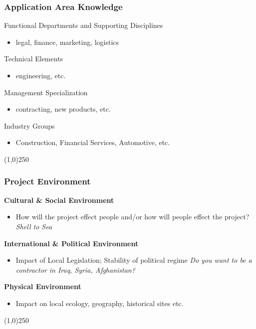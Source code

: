 \begin{frame}
\frametitle{Application Area Knowledge}
Functional Departments and Supporting Disciplines \\
	\begin{itemize}
	\item legal, finance, marketing, logistics
	\end{itemize}
Technical Elements \\
	\begin{itemize}
	\item engineering, etc.
	\end{itemize}
Management Specialization \\
	\begin{itemize}
	\item contracting, new products, etc.
	\end{itemize}
Industry Groups \\
	\begin{itemize}
	\item Construction, Financial Services, Automotive, etc.
	\end{itemize}
\end{frame}
\begin{center}\line(1,0){250}\end{center}




\begin{frame}
\frametitle{Project Environment}
\textbf{Cultural \& Social Environment}\\
\begin{itemize}
	\item How will the project effect people and/or how will people effect the project? \textit{Shell to Sea}
\end{itemize}
\textbf{International \& Political Environment}\\
\begin{itemize}
	\item Impact of Local Legislation; Stability of political regime \textit{Do you want to be a contractor in Iraq, Syria, Afghanistan?}
\end{itemize}
\textbf{Physical Environment }\\
\begin{itemize}
	\item Impact on local ecology, geography, historical sites etc. 
\end{itemize}
\end{frame}
\begin{center}\line(1,0){250}\end{center}



